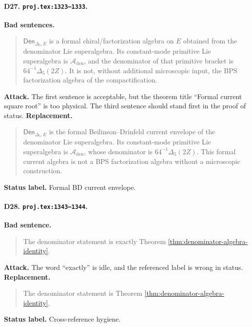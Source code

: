 \paragraph{D27. \texttt{proj.tex:1323--1333}.}
\textbf{Bad sentences.}
\begin{quote}\small
\(\mathsf{Den}_{\Delta_5,E}\) is a formal chiral/factorization algebra on
\(E\) obtained from the denominator Lie superalgebra.  Its constant-mode
primitive Lie superalgebra is \(\mathcal A_{\mathrm{den}}\), and the
denominator of that primitive bracket is \(64^{-1}\Delta_5(2Z)\).  It is
not, without additional microscopic input, the BPS factorization algebra
of the compactification.
\end{quote}
\textbf{Attack.}
The first sentence is acceptable, but the theorem title ``Formal current
square root'' is too physical.  The third sentence should stand first in
the proof of status.
\textbf{Replacement.}
\begin{quote}\small
\(\mathsf{Den}_{\Delta_5,E}\) is the formal Beilinson--Drinfeld current
envelope of the denominator Lie superalgebra.  Its constant-mode
primitive Lie superalgebra is \(\mathcal A_{\mathrm{den}}\), whose
denominator is \(64^{-1}\Delta_5(2Z)\).  This formal current algebra is
not a BPS factorization algebra without a microscopic construction.
\end{quote}
\textbf{Status label.} Formal BD current envelope.

\paragraph{D28. \texttt{proj.tex:1343--1344}.}
\textbf{Bad sentence.}
\begin{quote}\small
The denominator statement is exactly Theorem
\ref{thm:denominator-algebra-identity}.
\end{quote}
\textbf{Attack.}
The word ``exactly'' is idle, and the referenced label is wrong in
status.
\textbf{Replacement.}
\begin{quote}\small
The denominator statement is Theorem
\ref{thm:denominator-algebra-identity}.
\end{quote}
\textbf{Status label.} Cross-reference hygiene.

